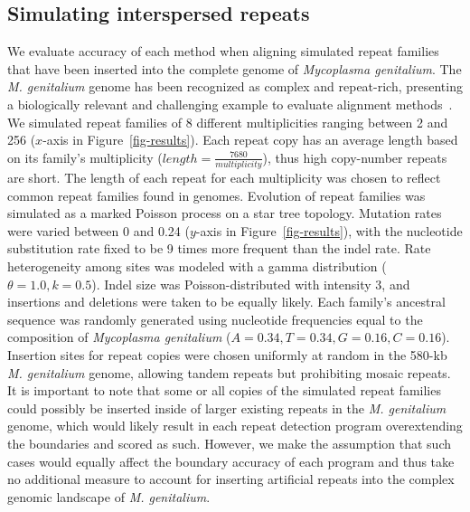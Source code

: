 \documentclass[12pt,journal,letterpaper,onecolumn, draftcls]{IEEEtran}
\begin{document}
\subsection*{Simulating interspersed repeats}
We evaluate accuracy of each method when aligning simulated repeat
families that have been inserted into the complete genome of
\emph{Mycoplasma genitalium}. The \emph{M. genitalium} genome has been recognized
as complex and repeat-rich, presenting a biologically
relevant and challenging example to evaluate alignment
methods~\cite{ref-mycoplasma}. We simulated repeat families of 8
different multiplicities ranging between 2 and 256 ($x$-axis in
Figure~\ref{fig-results}).  Each repeat copy has an average length
based on its family's multiplicity
($length=\frac{7680}{multiplicity}$), thus high copy-number repeats
are short.  The length of each repeat for each multiplicity was chosen
to reflect common repeat families found in genomes. Evolution of repeat families was simulated as a marked
Poisson process on a star tree
topology.  Mutation rates were varied between 0 and 0.24 ($y$-axis
in Figure~\ref{fig-results}), with the nucleotide substitution rate
fixed to be 9 times more frequent than the indel rate.  Rate heterogeneity among sites was modeled with a gamma
distribution ($\theta = 1.0, k = 0.5$).  Indel size was
Poisson-distributed with intensity 3, and insertions and deletions
were taken to be equally likely.  Each family's ancestral
sequence was randomly generated using nucleotide frequencies equal to
the composition of \emph{Mycoplasma genitalium}
($A=0.34,T=0.34,G=0.16,C=0.16$). Insertion sites for repeat copies
were chosen uniformly at random in the 580-kb \textit{M. genitalium} genome,
allowing tandem repeats but prohibiting mosaic repeats. It is important to note that some or all copies of the simulated repeat families
could possibly be inserted inside of larger existing repeats in the  \textit{M. genitalium} genome, which would
likely result in each repeat detection program overextending the boundaries and scored as such. However, we make the assumption
that such cases would equally affect the boundary accuracy of each program and thus take no additional measure to account for inserting
artificial repeats into the complex genomic landscape of \textit{M. genitalium}.
\end{document}
